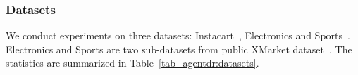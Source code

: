 \subsubsection{Datasets}
We conduct experiments on three datasets: Instacart~\cite{instacart}, %
Electronics and Sports~\cite{xmarket}. %
Electronics and Sports are two sub-datasets from public XMarket dataset~\cite{xmarket}.
The statistics are summarized in Table~\ref{tab_agentdr:datasets}. 
\begin{table}
  \caption{Statistics of datasets for AgentDR.}
  \label{tab_agentdr:datasets}
\end{table}

